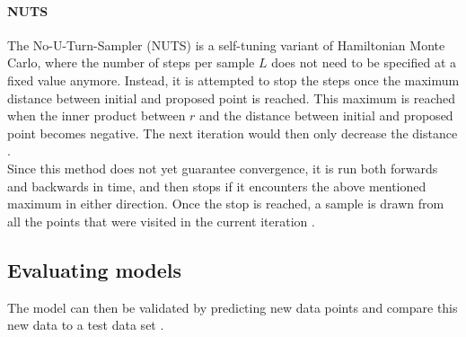 \documentclass{article}
\begin{document}
\paragraph{NUTS}
The No-U-Turn-Sampler (NUTS) is a self-tuning variant of Hamiltonian Monte Carlo, where the number of steps per sample $L$ does not need to be specified at a fixed value anymore. Instead,
it is attempted to stop the steps once the maximum distance between initial and proposed point is reached. This maximum is reached when the inner product between $r$ and the distance between initial and proposed point becomes negative. The next iteration would then only decrease the distance  \cite{1439840954}.
\\
Since this method does not yet guarantee convergence, it is run both forwards and backwards in time, and then stops if it encounters the above mentioned maximum in either direction.
Once the stop is reached, a sample is drawn from all the points that were visited in the current iteration \cite{hoffman2014no}.



\subsection{Evaluating models}
The model can then be validated by predicting new data points and compare this new data to a test data set \cite{1439840954}.
\end{document}
